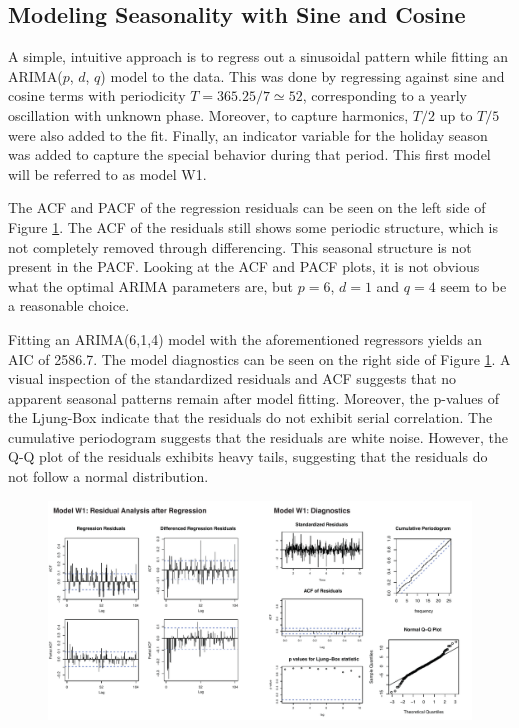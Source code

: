 \documentclass[conference]{IEEEtran}
\begin{document}
\subsection{Modeling Seasonality with Sine and Cosine}
A simple, intuitive approach is to regress out a sinusoidal pattern while fitting an ARIMA($p$, $d$, $q$) model to the data. This was done by regressing against sine and cosine terms with periodicity $T=365.25 / 7 \simeq 52$, corresponding to a yearly oscillation with unknown phase. Moreover, to capture harmonics, $T / 2$ up to $T / 5$ were also added to the fit. Finally, an indicator variable for the holiday season was added to capture the special behavior during that period. This first model will be referred to as model W1.
\par
The ACF and PACF of the regression residuals can be seen on the left side of Figure \ref{weekly_mod1}. The ACF of the residuals still shows some periodic structure, which is not completely removed through differencing. This seasonal structure is not present in the PACF. Looking at the ACF and PACF plots, it is not obvious what the optimal ARIMA parameters are, but $p=6$, $d=1$ and $q=4$ seem to be a reasonable choice. 
\par
Fitting an ARIMA(6,1,4) model with the aforementioned regressors yields an AIC of 2586.7. The model diagnostics can be seen on the right side of Figure \ref{weekly_mod1}. A visual inspection of the standardized residuals and ACF suggests that no apparent seasonal patterns remain after model fitting. Moreover, the p-values of the Ljung-Box indicate that the residuals do not exhibit serial correlation. The cumulative periodogram suggests that the residuals are white noise. However, the Q-Q plot of the residuals exhibits heavy tails, suggesting that the residuals do not follow a normal distribution.
\begin{figure}[ht]
	\centering
	\includegraphics[width=1\textwidth]{Figs/Fig3.pdf}
	\caption{}
	\label{weekly_mod1}
\end{figure}
\end{document}
